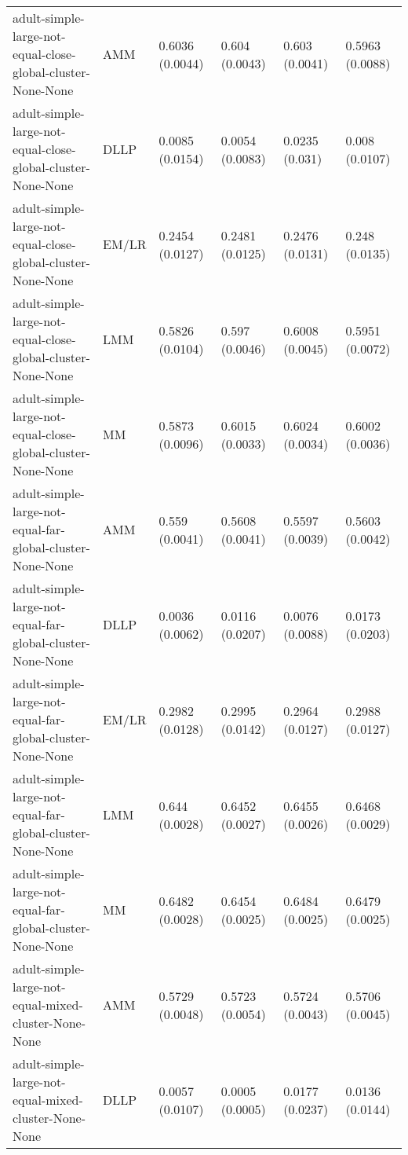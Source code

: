 \begin{tabular}{llllll}
                            adult-simple-large-not-equal-close-global-cluster-None-None &       AMM & 0.6036 (0.0044) &   0.604 (0.0043) &    0.603 (0.0041) &     0.5963 (0.0088) \\
                            adult-simple-large-not-equal-close-global-cluster-None-None &      DLLP & 0.0085 (0.0154) &  0.0054 (0.0083) &    0.0235 (0.031) &      0.008 (0.0107) \\
                            adult-simple-large-not-equal-close-global-cluster-None-None &     EM/LR & 0.2454 (0.0127) &  0.2481 (0.0125) &   0.2476 (0.0131) &      0.248 (0.0135) \\
                            adult-simple-large-not-equal-close-global-cluster-None-None &       LMM & 0.5826 (0.0104) &   0.597 (0.0046) &   0.6008 (0.0045) &     0.5951 (0.0072) \\
                            adult-simple-large-not-equal-close-global-cluster-None-None &        MM & 0.5873 (0.0096) &  0.6015 (0.0033) &   0.6024 (0.0034) &     0.6002 (0.0036) \\
                              adult-simple-large-not-equal-far-global-cluster-None-None &       AMM &  0.559 (0.0041) &  0.5608 (0.0041) &   0.5597 (0.0039) &     0.5603 (0.0042) \\
                              adult-simple-large-not-equal-far-global-cluster-None-None &      DLLP & 0.0036 (0.0062) &  0.0116 (0.0207) &   0.0076 (0.0088) &     0.0173 (0.0203) \\
                              adult-simple-large-not-equal-far-global-cluster-None-None &     EM/LR & 0.2982 (0.0128) &  0.2995 (0.0142) &   0.2964 (0.0127) &     0.2988 (0.0127) \\
                              adult-simple-large-not-equal-far-global-cluster-None-None &       LMM &  0.644 (0.0028) &  0.6452 (0.0027) &   0.6455 (0.0026) &     0.6468 (0.0029) \\
                              adult-simple-large-not-equal-far-global-cluster-None-None &        MM & 0.6482 (0.0028) &  0.6454 (0.0025) &   0.6484 (0.0025) &     0.6479 (0.0025) \\
                                   adult-simple-large-not-equal-mixed-cluster-None-None &       AMM & 0.5729 (0.0048) &  0.5723 (0.0054) &   0.5724 (0.0043) &     0.5706 (0.0045) \\
                                   adult-simple-large-not-equal-mixed-cluster-None-None &      DLLP & 0.0057 (0.0107) &  0.0005 (0.0005) &   0.0177 (0.0237) &     0.0136 (0.0144) \\

\end{tabular}
